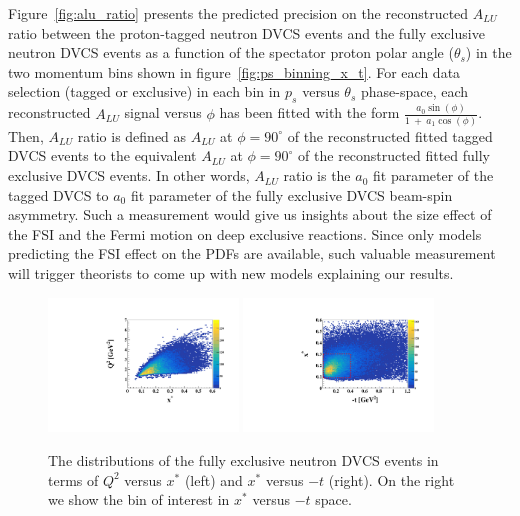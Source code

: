Figure~\ref{fig:alu_ratio} presents the predicted precision on the 
reconstructed $A_{LU}$ ratio between the proton-tagged neutron DVCS events and 
the fully exclusive neutron DVCS events as a function of the spectator proton 
polar angle ($\theta_s$) in the two momentum bins shown in 
figure~\ref{fig:ps_binning_x_t}. For each data selection (tagged or exclusive)
in each bin in $p_s$ versus $\theta_s$ phase-space, each reconstructed $A_{LU}$ 
signal versus $\phi$ has been fitted with the form 
$\frac{a_{0}\sin(\phi)}{1~+~a_{1}\cos(\phi)}$. Then, $A_{LU}$ ratio is defined 
as $A_{LU}$ at $\phi = 90^{\circ}$ of the reconstructed fitted tagged DVCS 
events to the equivalent $A_{LU}$ at $\phi= 90^{\circ}$ of the reconstructed 
fitted fully exclusive DVCS events. In other words, $A_{LU}$ ratio is the 
$a_{0}$ fit parameter of the tagged DVCS to $a_{0}$ fit parameter of the fully 
exclusive DVCS beam-spin asymmetry. Such a measurement would give us insights 
about the size effect of the FSI and the Fermi motion on deep exclusive 
reactions. Since only models predicting the FSI effect on the PDFs are 
available, such valuable measurement will trigger theorists to come up with new 
models explaining our results.



\begin{figure}[htb]
  \centering
    \includegraphics[width=0.45\textwidth,clip]{figs_epngamma/pdf/epngamma_Q2_x*.pdf}
    \includegraphics[width=0.45\textwidth,clip]{figs_epngamma/pdf/epngamma_t_x*.pdf}
   \caption{The distributions of the fully exclusive neutron DVCS events in 
   terms of $Q^2$ versus $x^*$ (left) and  $x^{*}$ versus $-t$ (right). On the 
   right we show the bin of interest in $x^{*}$ versus $-t$ space.
   \label{fig:exclusive_binning_x_t}}
\end{figure}



